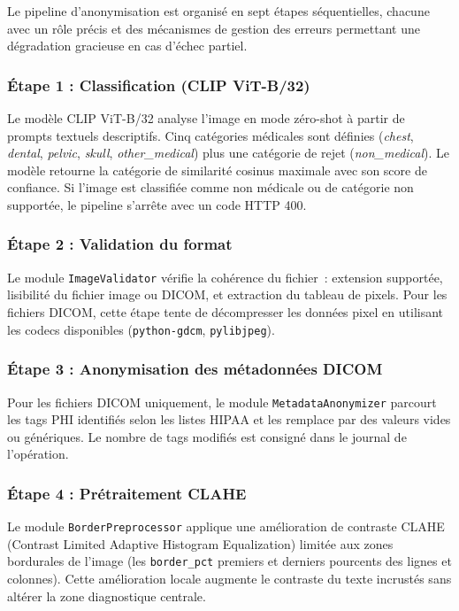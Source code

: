 Le pipeline d'anonymisation est organisé en sept étapes séquentielles, chacune avec un rôle précis et des mécanismes de gestion des erreurs permettant une dégradation gracieuse en cas d'échec partiel.

\subsubsection{Étape 1 : Classification (CLIP ViT-B/32)}

Le modèle CLIP ViT-B/32 analyse l'image en mode zéro-shot à partir de prompts textuels descriptifs. Cinq catégories médicales sont définies (\textit{chest}, \textit{dental}, \textit{pelvic}, \textit{skull}, \textit{other\_medical}) plus une catégorie de rejet (\textit{non\_medical}). Le modèle retourne la catégorie de similarité cosinus maximale avec son score de confiance. Si l'image est classifiée comme non médicale ou de catégorie non supportée, le pipeline s'arrête avec un code HTTP 400.

\subsubsection{Étape 2 : Validation du format}

Le module \texttt{ImageValidator} vérifie la cohérence du fichier~: extension supportée, lisibilité du fichier image ou DICOM, et extraction du tableau de pixels. Pour les fichiers DICOM, cette étape tente de décompresser les données pixel en utilisant les codecs disponibles (\texttt{python-gdcm}, \texttt{pylibjpeg}).

\subsubsection{Étape 3 : Anonymisation des métadonnées DICOM}

Pour les fichiers DICOM uniquement, le module \texttt{MetadataAnonymizer} parcourt les tags PHI identifiés selon les listes HIPAA et les remplace par des valeurs vides ou génériques. Le nombre de tags modifiés est consigné dans le journal de l'opération.

\subsubsection{Étape 4 : Prétraitement CLAHE}

Le module \texttt{BorderPreprocessor} applique une amélioration de contraste CLAHE (Contrast Limited Adaptive Histogram Equalization) limitée aux zones bordurales de l'image (les \texttt{border\_pct} premiers et derniers pourcents des lignes et colonnes). Cette amélioration locale augmente le contraste du texte incrustés sans altérer la zone diagnostique centrale.

